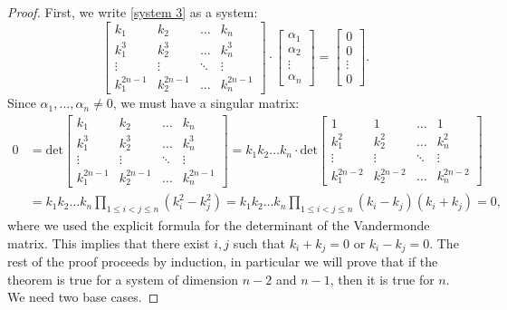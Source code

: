 \documentclass[10pt,a4paper]{amsart}
\begin{document}
\begin{proof}
First, we write \eqref{system 3} as a system:
\[
\begin{bmatrix}
k_1 & k_2  & \dots  & k_n \\
k_1^3 & k_2^3 & \dots  & k_n^3 \\
\vdots & \vdots & \ddots & \vdots \\
k_1^{2n-1} & k_2^{2n-1} & \dots  & k_n^{2n-1}
\end{bmatrix} 
\cdot
\begin{bmatrix}
\alpha_1 \\
\alpha_2 \\
\vdots \\
\alpha_n
\end{bmatrix}
=
\begin{bmatrix}
0 \\
0 \\
\vdots \\
0
\end{bmatrix}.
\]
Since $\alpha_1,\ldots,\alpha_n\neq 0$, we must have a singular matrix: 
\begin{equation} 
\begin{split}
0 & = \mathrm{det}
\begin{bmatrix}
k_1 & k_2  & \dots  & k_n \\
k_1^3 & k_2^3 & \dots  & k_n^3 \\
\vdots & \vdots & \ddots & \vdots \\
k_1^{2n-1} & k_2^{2n-1} & \dots  & k_n^{2n-1}
\end{bmatrix}
= k_1k_2\dots k_n \cdot \mathrm{det}
\begin{bmatrix}
1 & 1  & \dots  & 1 \\
k_1^2 & k_2^2 & \dots  & k_n^2 \\
\vdots & \vdots & \ddots & \vdots \\
k_1^{2n-2} & k_2^{2n-2} & \dots  & k_n^{2n-2}
\end{bmatrix} \\
& = k_1k_2\dots k_n \prod_{1 \le i < j \le n} (k_i^2-k_j^2) = k_1k_2\dots k_n \prod_{1 \le i < j \le n}(k_i-k_j)(k_i+k_j)=0,
\label{vandermonde2}
\end{split}
\end{equation}
where we used the explicit formula for the determinant of the Vandermonde matrix.
This implies that there exist $i,j$ such that $k_i+k_j=0$ or $k_i-k_j=0$. 
The rest of the proof proceeds by induction, in particular we will prove that if the theorem is true for a system of dimension $n-2$ and $n-1$, then it is true for $n$. We need two base cases.


\end{proof}
\end{document}

